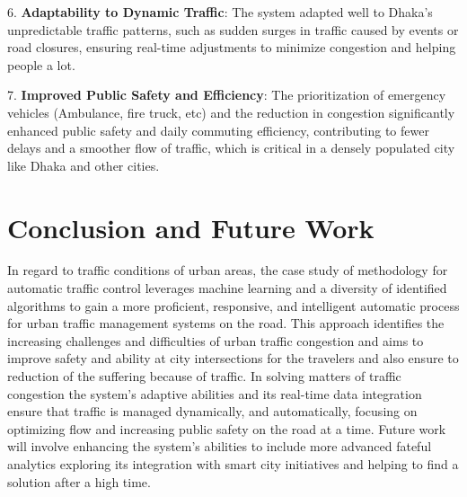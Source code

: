 \documentclass[usenatbib]{tjaa}
\begin{document}
6. \textbf{Adaptability to Dynamic Traffic}:  
   The system adapted well to Dhaka’s unpredictable traffic patterns, such as sudden surges in traffic caused by events or road closures, ensuring real-time adjustments to minimize congestion and helping people a lot.

7. \textbf{Improved Public Safety and Efficiency}:  
   The prioritization of emergency vehicles (Ambulance, fire truck, etc) and the reduction in congestion significantly enhanced public safety and daily commuting efficiency, contributing to fewer delays and a smoother flow of traffic, which is critical in a densely populated city like Dhaka and other cities.

\section[]{Conclusion and Future Work}
In regard to traffic conditions of urban areas, the case study of methodology for automatic traffic control leverages machine learning and a diversity of identified algorithms to gain a more proficient, responsive, and intelligent automatic process for urban
traffic management systems on the road. This approach identifies the increasing challenges and difficulties of urban traffic congestion and aims to improve safety and ability at city intersections for the travelers and also ensure to reduction of the suffering because of traffic. In solving matters of traffic congestion the system’s adaptive abilities and its real-time data integration ensure that traffic is managed dynamically, and automatically, focusing on optimizing flow and increasing public safety on the road at a time. Future work will involve enhancing the system’s abilities to include more advanced fateful analytics exploring its integration with smart city initiatives and helping to find a solution after a high time.
\end{document}
